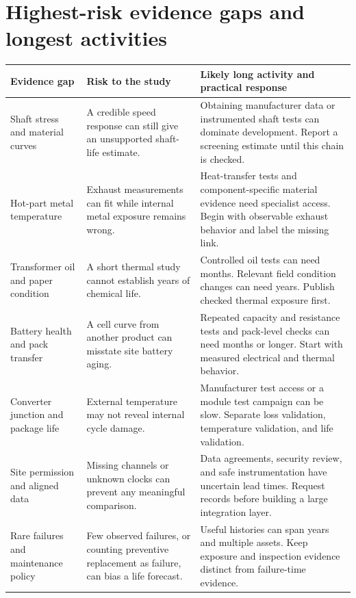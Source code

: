 \documentclass[11pt,a4paper]{report}
\begin{document}
\section{Highest-risk evidence gaps and longest activities}
\begin{longtable}{L{0.19\textwidth}L{0.34\textwidth}L{0.35\textwidth}}
\toprule Evidence gap & Risk to the study & Likely long activity and practical response \\ \midrule\endhead
Shaft stress and material curves & A credible speed response can still give an unsupported shaft-life estimate. & Obtaining manufacturer data or instrumented shaft tests can dominate development. Report a screening estimate until this chain is checked. \\
Hot-part metal temperature & Exhaust measurements can fit while internal metal exposure remains wrong. & Heat-transfer tests and component-specific material evidence need specialist access. Begin with observable exhaust behavior and label the missing link. \\
Transformer oil and paper condition & A short thermal study cannot establish years of chemical life. & Controlled oil tests can need months. Relevant field condition changes can need years. Publish checked thermal exposure first. \\
Battery health and pack transfer & A cell curve from another product can misstate site battery aging. & Repeated capacity and resistance tests and pack-level checks can need months or longer. Start with measured electrical and thermal behavior. \\
Converter junction and package life & External temperature may not reveal internal cycle damage. & Manufacturer test access or a module test campaign can be slow. Separate loss validation, temperature validation, and life validation. \\
Site permission and aligned data & Missing channels or unknown clocks can prevent any meaningful comparison. & Data agreements, security review, and safe instrumentation have uncertain lead times. Request records before building a large integration layer. \\
Rare failures and maintenance policy & Few observed failures, or counting preventive replacement as failure, can bias a life forecast. & Useful histories can span years and multiple assets. Keep exposure and inspection evidence distinct from failure-time evidence. \\
\bottomrule
\end{longtable}
\end{document}
